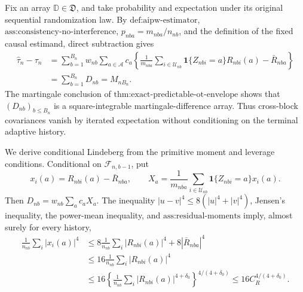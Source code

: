 Fix an array \(\mathbb D\in\mathfrak D\), and take probability and expectation under its original sequential randomization law. By \(\text{def:aipw-estimator}\), \(\text{ass:consistency-no-interference}\), \(p_{nba}=m_{nba}/n_{nb}\), and the definition of the fixed causal estimand, direct subtraction gives
\[
\begin{aligned}
\widehat\tau_n-\tau_n
&=\sum_{b=1}^{B_n}w_{nb}\sum_{a\in\mathcal A}c_a
\left\{\frac1{m_{nba}}\sum_{i\in\mathcal U_{nb}}
\mathbf 1\{Z_{nbi}=a\}R_{nbi}(a)-\bar R_{nba}\right\}\\
&=\sum_{b=1}^{B_n}D_{nb}=M_{nB_n}.
\end{aligned}
\tag{1}
\]
The martingale conclusion of \(\text{thm:exact-predictable-ot-envelope}\) shows that \((D_{nb})_{b\le B_n}\) is a square-integrable martingale-difference array. Thus cross-block covariances vanish by iterated expectation without conditioning on the terminal adaptive history.

We derive conditional Lindeberg from the primitive moment and leverage conditions. Conditional on \(\mathcal F_{n,b-1}\), put
\[
x_i(a)=R_{nbi}(a)-\bar R_{nba},
\qquad
X_a=\frac1{m_{nba}}\sum_{i\in\mathcal U_{nb}}
\mathbf 1\{Z_{nbi}=a\}x_i(a).
\]
Then \(D_{nb}=w_{nb}\sum_ac_aX_a\). The inequality \(|u-v|^4\le8(|u|^4+|v|^4)\), Jensen's inequality, the power-mean inequality, and \(\text{ass:residual-moments}\) imply, almost surely for every history,
\[
\begin{aligned}
\frac1{n_{nb}}\sum_i|x_i(a)|^4
&\le 8\frac1{n_{nb}}\sum_i|R_{nbi}(a)|^4+8|\bar R_{nba}|^4\\
&\le16\frac1{n_{nb}}\sum_i|R_{nbi}(a)|^4\\
&\le16\left\{\frac1{n_{nb}}\sum_i|R_{nbi}(a)|^{4+\delta_0}\right\}^{4/(4+\delta_0)}
\le16C_R^{4/(4+\delta_0)}.
\end{aligned}
\tag{2}
\]

